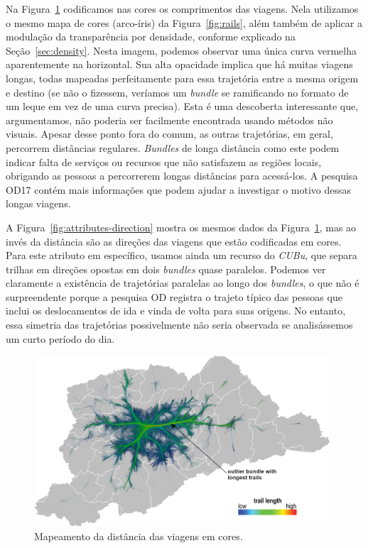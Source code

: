 Na Figura~\ref{fig:attributes-length} codificamos nas cores os comprimentos das
viagens. Nela utilizamos o mesmo mapa de cores (arco-íris) da
Figura~\ref{fig:rails}, além também de aplicar a modulação da transparência por densidade,
conforme explicado na Seção~\ref{sec:density}. Nesta imagem, podemos observar
uma única curva vermelha aparentemente na horizontal. Sua alta opacidade implica
que há muitas viagens longas, todas mapeadas perfeitamente para essa trajetória
entre a mesma origem e destino (se não o fizessem, veríamos um \emph{bundle} se
ramificando no formato de um leque em vez de uma curva precisa). Esta é uma
descoberta interessante que, argumentamos, não poderia ser facilmente encontrada
usando métodos não visuais. Apesar desse ponto fora do comum, as outras trajetórias,
em geral, percorrem distâncias regulares. \emph{Bundles} de longa distância como
este podem indicar falta de serviços ou recursos que não satisfazem as regiões
locais, obrigando as pessoas a percorrerem longas distâncias para acessá-los. A
pesquisa OD17 contém mais informações que podem ajudar a investigar o motivo
dessas longas viagens.

A Figura~\ref{fig:attributes-direction} mostra os mesmos dados da
Figura~\ref{fig:attributes-length}, mas ao invés da distância são as direções
das viagens que estão codificadas em cores. Para este atributo em específico,
usamos ainda um recurso do \emph{CUBu}, que separa trilhas em direções opostas
em dois \emph{bundles} quase paralelos. Podemos ver claramente a existência de
trajetórias paralelas ao longo dos \emph{bundles}, o que não é surpreendente
porque a pesquisa OD registra o trajeto típico das pessoas que inclui os
deslocamentos de ida e vinda de volta para suas origens. No entanto, essa
simetria das trajetórias possivelmente não seria observada se analisássemos um
curto período do dia.

\begin{figure}[!htb] \centering \captionsetup{justification=centering}
  \includegraphics[width=0.98\textwidth]{../figuras/distances.png}
  \caption{Mapeamento da distância das viagens em cores. \label{fig:attributes-length}}
  \end{figure}

